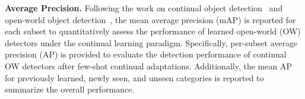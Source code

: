 \noindent\textbf{Average Precision. }
Following the work on continual object detection~\cite{dong2023incremental,liu2023continual,deng2024zero,zhang2024dynamic} and open-world object detection~\cite{li2021grounded,wang2024ov,zhang2022glipv2,bansal2018zero,ma2022open}, the mean average precision (mAP) is reported for each subset to quantitatively assess the performance of learned open-world (OW) detectors under the continual learning paradigm. Specifically, per-subset average precision (AP) is provided to evaluate the detection performance of continual OW detectors after few-shot continual adaptations. Additionally, the mean AP for previously learned, newly seen, and unseen categories is reported to summarize the overall performance.
% 

